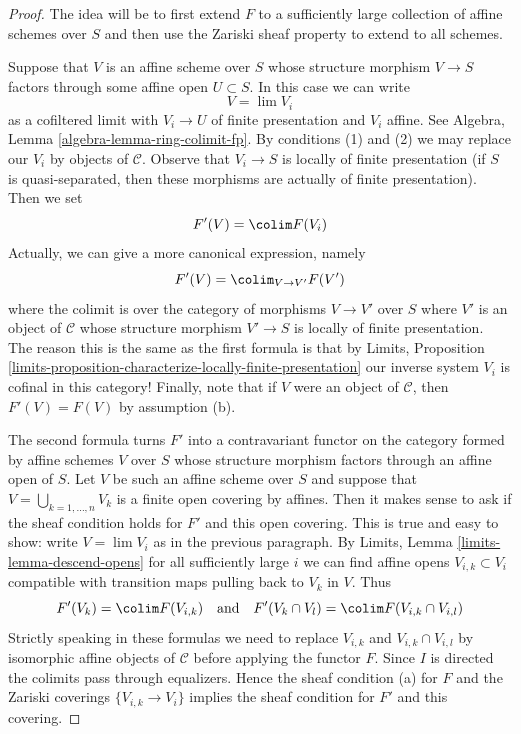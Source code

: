 \begin{proof}
The idea will be to first extend $F$ to a sufficiently large collection of
affine schemes over $S$ and then use the Zariski sheaf property to extend
to all schemes.

\medskip\noindent
Suppose that $V$ is an affine scheme over $S$ whose structure morphism
$V \to S$ factors through some affine open $U \subset S$. In this case
we can write
$$
V = \lim V_i
$$
as a cofiltered limit with $V_i \to U$ of finite presentation
and $V_i$ affine. See Algebra, Lemma \ref{algebra-lemma-ring-colimit-fp}.
By conditions (1) and (2)
we may replace our $V_i$ by objects of $\mathcal{C}$.
Observe that $V_i \to S$ is locally of finite presentation
(if $S$ is quasi-separated, then these morphisms are actually
of finite presentation). Then we set
$$
F'(V) = \colim F(V_i)
$$
Actually, we can give a more canonical expression, namely
$$
F'(V) = \colim_{V \to V'} F(V')
$$
where the colimit is over the category of morphisms $V \to V'$ over $S$
where $V'$ is an object of $\mathcal{C}$ whose structure
morphism $V' \to S$ is locally of finite presentation.
The reason this is the same as the first formula is that by
Limits, Proposition
\ref{limits-proposition-characterize-locally-finite-presentation}
our inverse system $V_i$ is cofinal in this category!
Finally, note that if $V$ were an object of $\mathcal{C}$,
then $F'(V) = F(V)$ by assumption (b).

\medskip\noindent
The second formula turns $F'$ into a contravariant functor
on the category formed by affine schemes $V$ over $S$ whose
structure morphism factors through an affine open of $S$.
Let $V$ be such an affine scheme over $S$ and
suppose that $V = \bigcup_{k = 1, \ldots, n} V_k$ is a finite open covering
by affines. Then it makes sense to ask if the sheaf condition
holds for $F'$ and this open covering.
This is true and easy to show: write $V = \lim V_i$ as in
the previous paragraph. By Limits, Lemma \ref{limits-lemma-descend-opens}
for all sufficiently large $i$ we can find affine opens
$V_{i, k} \subset V_i$ compatible with transition maps
pulling back to $V_k$ in $V$. Thus
$$
F'(V_k) = \colim F(V_{i, k})
\quad\text{and}\quad
F'(V_k \cap V_l) = \colim F(V_{i, k} \cap V_{i, l})
$$
Strictly speaking in these formulas we need to replace $V_{i, k}$ and
$V_{i, k} \cap V_{i, l}$ by isomorphic affine objects of $\mathcal{C}$
before applying the functor $F$.
Since $I$ is directed the colimits pass through equalizers.
Hence the sheaf condition (a) for $F$ and the Zariski coverings
$\{V_{i, k} \to V_i\}$ implies the sheaf
condition for $F'$ and this covering.


\end{proof}
